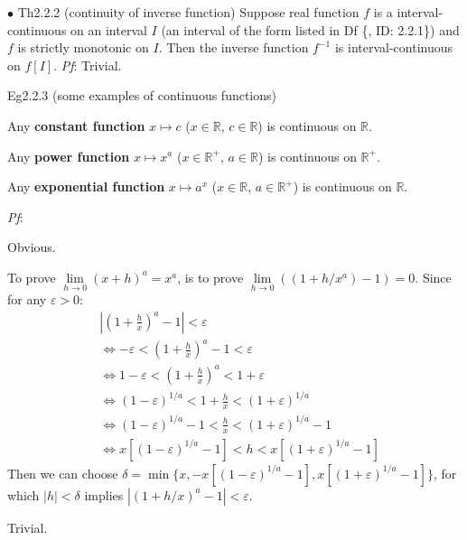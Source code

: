 \documentclass{article}
\begin{document}
\begin{Th}{$\bullet$ Th2.2.2 (continuity of inverse function)}
    Suppose real function $f$ is a interval-continuous on an interval $I$ (an interval of the form listed in Df \{, ID: 2.2.1\}) and $f$ is strictly monotonic on $I$. Then the inverse function $f^{-1}$ is interval-continuous on $f[I]$.
    \tcblower
    \textit{Pf}: Trivial.
\end{Th}

\begin{Th}{Eg2.2.3 (some examples of continuous functions)}
    \begin{compactenum}
        \item Any \textcolor{Df}{\textbf{constant function} $x\mapsto c$ ($x\in\mathbb{R}$, $c\in\mathbb{R}$)} is continuous on $\mathbb{R}$.
        \item Any \textcolor{Df}{\textbf{power function} $x\mapsto x^a$ ($x\in\mathbb{R}^+$, $a\in\mathbb{R}$)} is continuous on $\mathbb{R}^+$.
        \item Any \textcolor{Df}{\textbf{exponential function} $x\mapsto a^x$ ($x\in\mathbb{R}$, $a\in\mathbb{R}^+$)} is continuous on $\mathbb{R}$.
    \end{compactenum} 
    \tcblower
    \textit{Pf}: 
    \begin{compactenum}
        \item Obvious.
        \item To prove $\lim\limits_{h\to 0} (x+h)^a = x^a$, is to prove $\lim\limits_{h\to 0} \left((1+h/x^a) - 1 \right) = 0$. Since for any $\varepsilon>0$:
            $$
            \begin{aligned}
                & \left|\left(1+\frac{h}{x}\right)^{a}-1\right|<\varepsilon \\
                & \Leftrightarrow-\varepsilon<\left(1+\frac{h}{x}\right)^a-1<\varepsilon \\
                & \Leftrightarrow1-\varepsilon<\left(1+\frac{h}{x}\right)^{a}<1+\varepsilon \\
                & \Leftrightarrow(1-\varepsilon)^{1/a}<1+\frac{h}{x}<(1+\varepsilon)^{1/a} \\
                & \Leftrightarrow(1-\varepsilon)^{1/a}-1<\frac{h}{x}<(1+\varepsilon)^{1/a}-1 \\
                & \Leftrightarrow x[(1-\varepsilon)^{1/a}-1]<h<x[(1+\varepsilon)^{1/a}-1]
           \end{aligned}
           $$
           Then we can choose $\delta=\min\{x,-x[(1-\varepsilon)^{1/a}-1],x[(1+\varepsilon)^{1/a}-1]\}$, for which $|h|<\delta$ implies $\left|\left(1+h/x\right)^{a}-1\right|<\varepsilon$.
        \item Trivial.
    \end{compactenum}
\end{Th}
\end{document}
